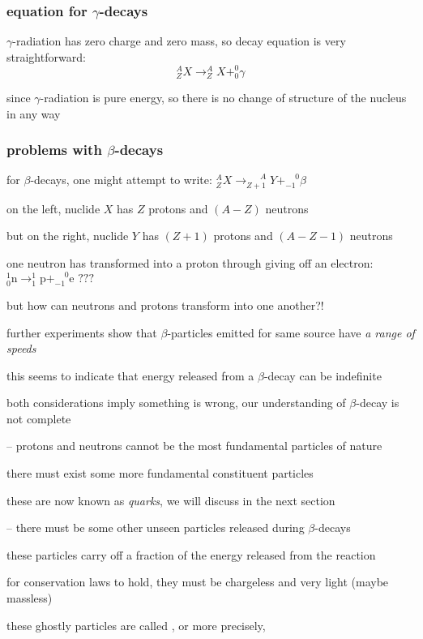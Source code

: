 \subsubsection*{equation for \texorpdfstring{$\gamma$}{\textgamma}-decays}

$\gamma$-radiation has zero charge and zero mass, so decay equation is very straightforward:
\begin{equation*}
\boxed{_Z^A X \longrightarrow _{Z}^{A} X + _0^0\gamma}
\end{equation*}

since $\gamma$-radiation is pure energy, so there is no change of structure of the nucleus in any way



\subsubsection*{problems with \texorpdfstring{$\beta$}{\textbeta}-decays}

for $\beta$-decays, one might attempt to write: $
	_Z^A X \longrightarrow _{Z+1}^{\phantom{1+}A} Y + _{-1}^{\phantom{+}0}\beta$ 

on the left, nuclide $X$ has $Z$ protons and $(A-Z)$ neutrons

but on the right, nuclide $Y$ has $(Z+1)$ protons and $(A-Z-1)$ neutrons

one neutron has transformed into a proton through giving off an electron: $_0^1 \text{n} \longrightarrow _1^1 \text{p} + _{-1}^{\phantom{+}0}\text{e} \,\, \text{???}$

but how can neutrons and protons transform into one another?!

further experiments show that $\beta$-particles emitted for same source have \emph{a range of speeds}

this seems to indicate that energy released from a $\beta$-decay can be indefinite

both considerations imply something is wrong, our understanding of $\beta$-decay is not complete

\begin{compactenum}
	\item[--] protons and neutrons cannot be the most fundamental particles of nature
	
	there must exist some more fundamental constituent particles
	
	these are now known as \emph{quarks}, we will discuss in the next section
	
	\item[--] there must be some other unseen particles released during $\beta$-decays
	
	these particles carry off a fraction of the energy released from the reaction
	
	for conservation laws to hold, they must be chargeless and very light (maybe massless)
	
	these ghostly particles are called , or more precisely, 
\end{compactenum}


